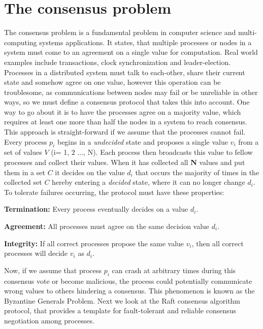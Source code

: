 \section{The consensus problem}

The consensus problem is a fundamental problem in computer science and multi-computing systems applications. It states, that multiple processes or nodes in a system must come to an agreement on a single value for computation. Real world examples include transactions, clock synchronization and leader-election. Processes in a distributed system must talk to each-other, share their current state and somehow agree on one value, however this operation can be troublesome, as communications between nodes may fail or be unreliable in other ways, so we must define a consensus protocol that takes this into account. One way to go about it is to have the processes agree on a majority value, which requires at least one more than half the nodes in a system to reach consensus. This approach is straight-forward if we assume that the processes cannot fail. Every process $p_i$ begins in a \textit{undecided} state and proposes a single value $v_i$ from a set of values $V$ (i= 1, 2 ..., N). Each process then broadcasts this value to fellow processes and collect their values. When it has collected all \textbf{N} values and put them in a set $C$ it decides on the value $d_i$ that occurs the majority of times in the collected set $C$ hereby entering a \textit{decided} state, where it can no longer change $d_i$. To tolerate failures occurring, the protocol must have these properties:

\noindent \textbf{Termination:} Every process eventually decides on a value $d_i$.

\noindent \textbf{Agreement:} All processes must agree on the same decision value $d_i$.

\noindent \textbf{Integrity:} If all correct processes propose the same value $v_i$, then all correct processes will decide $v_i$ as $d_i$.

\noindent Now, if we assume that process $p_i$ can crash at arbitrary times during this consensus vote or become malicious, the process could potentially communicate wrong values to others hindering a consensus. This phenomenon is known as the Byzantine Generals Problem. Next we look at the Raft consensus algorithm protocol, that provides a template for fault-tolerant and reliable consensus negotiation among processes.